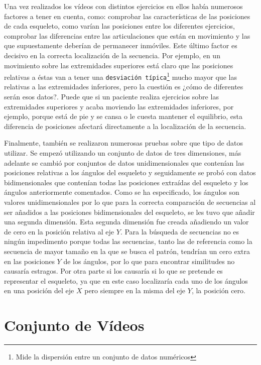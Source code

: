 Una vez realizados los vídeos con distintos ejercicios en ellos había numerosos factores a tener en cuenta, como: comprobar las características de las posiciones de cada esqueleto, como varían las posiciones entre los diferentes ejercicios, comprobar las diferencias entre las articulaciones que están en movimiento y las que supuestamente deberían de permanecer inmóviles. Este último factor es decisivo en la correcta localización de la secuencia. Por ejemplo, en un movimiento sobre las extremidades superiores está claro que las posiciones relativas a éstas van a tener una \texttt{desviación típica}\footnote{Mide la dispersión entre un conjunto de datos numéricos} mucho mayor que las relativas a las extremidades inferiores, pero la cuestión es ¿cómo de diferentes serán esos datos?. Puede que si un paciente realiza ejercicios sobre las extremidades superiores y acaba moviendo las extremidades inferiores, por ejemplo, porque está de pie y se cansa o le cuesta mantener el equilibrio, esta diferencia de posiciones afectará directamente a la localización de la secuencia.

Finalmente, también se realizaron numerosas pruebas sobre que tipo de datos utilizar. Se empezó utilizando un conjunto de datos de tres dimensiones, más adelante se cambió por conjuntos de datos unidimensionales que contenían las posiciones relativas a los ángulos del esqueleto y seguidamente se probó con datos bidimensionales que contenían todas las posiciones extraídas del esqueleto y los ángulos anteriormente comentados. Como se ha especificado, los ángulos son valores unidimensionales por lo que para la correcta comparación de secuencias al ser añadidos a las posiciones bidimensionales del esqueleto, se les tuvo que añadir una segunda dimensión. Esta segunda dimensión fue creada añadiendo un valor de cero en la posición relativa al eje $Y$. Para la búsqueda de secuencias no es ningún impedimento porque todas las secuencias, tanto las de referencia como la secuencia de mayor tamaño en la que se busca el patrón, tendrían un cero extra en las posiciones $Y$ de los ángulos, por lo que para encontrar similitudes no causaría estragos. Por otra parte si los causaría si lo que se pretende es representar el esqueleto, ya que en este caso localizaría cada uno de los ángulos en una posición del eje $X$ pero siempre en la misma del eje $Y$, la posición cero.


\section{Conjunto de Vídeos} \label{cap:Cvideos}

